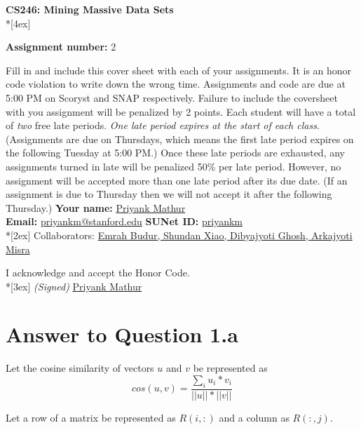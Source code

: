 \documentclass[11pt]{article}
\begin{document}
\thispagestyle{empty}
\parindent 0pt
\vfill
\large

\begin{center}
\LARGE{\bf \textsf{CS246: Mining Massive Data Sets}} \\*[4ex]
\end{center}

{\Large
\textbf{Assignment number:} 2
\vfill
\vfill

Fill in and include this cover sheet with each of your assignments. It is an honor code
violation to write down the wrong time. Assignments and code are due at 5:00 PM on Scoryst and SNAP respectively. Failure to include the coversheet with you assignment will
be penalized by 2 points.
Each student will have a total of \textit{two} free late periods. \textit{One late period expires at the start of
each class}. (Assignments are due on Thursdays, which means the first late period expires on
the following Tuesday at 5:00 PM.) Once these late periods are exhausted, any assignments
turned in late will be penalized 50\% per late period. However, no assignment will be accepted
more than one late period after its due date. (If an assignment is due to Thursday then we
will not accept it after the following Thursday.)
\vfill
\vfill
{\Large
\textbf{Your name:} \underline{Priyank Mathur} \\
\textbf{Email:} \underline{priyankm@stanford.edu} \textbf{SUNet ID:} \underline{priyankm}\\*[2ex] }
Collaborators: \underline{Emrah Budur, Shundan Xiao, Dibyajyoti Ghosh, Arkajyoti Misra} \\
\vfill

\vfill

I acknowledge and accept the Honor Code.\\*[3ex]
\bigskip
\textit{(Signed)} \underline{Priyank Mathur}

\vfill
\vfill

\pagebreak[4]
\section*{Answer to Question 1.a}

Let the cosine similarity of vectors $u$ and $v$ be represented as 
$$ cos(u, v) = \frac{ \sum_{i} u_i * v_i }{||u|| * ||v||} $$

Let a row of a matrix be represented as $R(i, :)$ and a column as $R(:, j)$.\\

}
\end{document}
